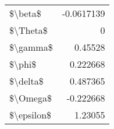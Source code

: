 \begin{tabular}{lr}
\hline
 \$\textbackslash{}beta\$    & -0.0617139 \\
 \$\textbackslash{}Theta\$   &  0         \\
 \$\textbackslash{}gamma\$   &  0.45528   \\
 \$\textbackslash{}phi\$     &  0.222668  \\
 \$\textbackslash{}delta\$   &  0.487365  \\
 \$\textbackslash{}Omega\$   & -0.222668  \\
 \$\textbackslash{}epsilon\$ &  1.23055   \\
\hline
\end{tabular}